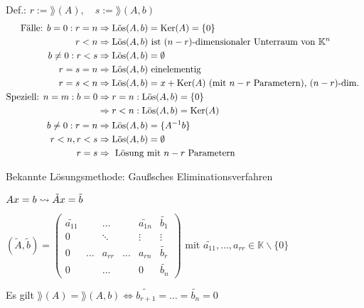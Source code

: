 Def.: $r := \rang(A),\quad s := \rang(A,b)$
\begin{align*}
\text{Fälle: } b =0 : r = n &\Rightarrow \mathrm{L\ddot{o}s}(A,b)=\operatorname*{\mathrm{Ker}}(A)=\{0\}\\
r<n &\Rightarrow \mathrm{L\ddot{o}s}(A,b) \text{ ist $(n-r)$-dimensionaler Unterraum
von } \mathbb{K}^n \\
b \neq 0: r<s &\Rightarrow \mathrm{L\ddot{o}s}(A,b) = \emptyset \\
r=s=n &\Rightarrow \mathrm{L\ddot{o}s}(A,b) \text{ einelementig }\\
r=s<n &\Rightarrow \mathrm{L\ddot{o}s}(A,b) = x + \operatorname*{\mathrm{Ker}}(A)
\text{ (mit $n-r$ Parametern), $(n-r)$-dim. } \\
\text{Speziell: } n=m: b=0 &\Rightarrow r=n: \mathrm{L\ddot{o}s}(A,b) = \{0\}\\
&\Rightarrow r<n: \mathrm{L\ddot{o}s}(A,b) = \operatorname*{\mathrm{Ker}}(A)\\
b \neq 0: r=n &\Rightarrow \mathrm{L\ddot{o}s}(A,b) = \{A^{-1}b\}\\
	r<n, r<s &\Rightarrow \mathrm{L\ddot{o}s}(A,b) = \emptyset \\
	 r=s &\Rightarrow \text{ Lösung mit $n-r$ Parametern } \\
\end{align*}

Bekannte Lösungsmethode: Gaußsches Eliminationsverfahren

$Ax=b \rightsquigarrow \tilde{A}x = \tilde{b} \\$

\(
(\tilde{A},\tilde{b})=
\begin{pmatrix}
\tilde{a_{11}} & &\dots  &  & \tilde{a_{1n}} & \tilde{b_1} \\
0 & & \ddots &  & \vdots & \vdots \\
0 & \dots & a_{rr} & \dots & a_{rn} & \tilde{b_r} \\
0 & & \dots & & 0 & \tilde{b_n} \end{pmatrix}
\)
mit $\tilde{a_{11}}, \dots, a_{rr} \in \mathbb{K} \backslash \{0\} $

Es gilt $\rang(A)= \rang(A,b) \Leftrightarrow
\tilde{b_{r+1}} = \dots = \tilde{b_n} = 0$

